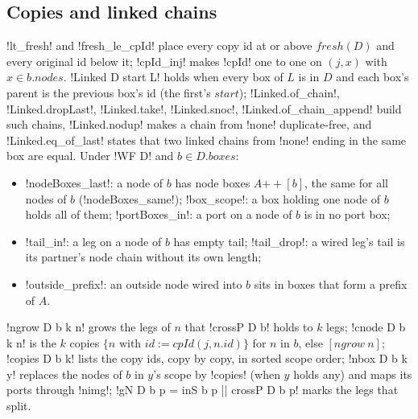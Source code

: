 {\subsection{Copies and linked chains}
\lbx!lt_fresh! and \lbx!fresh_le_cpId! place every copy id at or above $\mathit{fresh}(D)$ and every original id below it; \lbx!cpId_inj! makes \lbx!cpId! one to one on $(j,x)$ with $x\in b.\mathit{nodes}$. \lbx!Linked D start L! holds when every box of $L$ is in $D$ and each box's parent is the previous box's id (the first's $\mathit{start}$); \lbx!Linked.of_chain!, \lbx!Linked.dropLast!, \lbx!Linked.take!, \lbx!Linked.snoc!, \lbx!Linked.of_chain_append! build such chains, \lbx!Linked.nodup! makes a chain from \lbx!none! duplicate-free, and \lbx!Linked.eq_of_last! states that two linked chains from \lbx!none! ending in the same box are equal. Under \lbx!WF D! and $b\in D.\mathit{boxes}$:
\begin{itemize}
\item \lbx!nodeBoxes_last!: a node of $b$ has node boxes $A\mathbin{+\!\!+}[b]$, the same for all nodes of $b$ (\lbx!nodeBoxes_same!); \lbx!box_scope!: a box holding one node of $b$ holds all of them; \lbx!portBoxes_in!: a port on a node of $b$ is in no port box;
\item \lbx!tail_in!: a leg on a node of $b$ has empty tail; \lbx!tail_drop!: a wired leg's tail is its partner's node chain without its own length;
\item \lbx!outside_prefix!: an outside node wired into $b$ sits in boxes that form a prefix of $A$.
\end{itemize}

\begin{definition}\label{def:boxes-copy}
\lbx!ngrow D b k n! grows the legs of $n$ that \lbx!crossP D b! holds to $k$ legs; \lbx!cnode D b k n! is the $k$ copies $\{n\text{ with } \mathit{id}:=\mathit{cpId}(j,n.\mathit{id})\}$ for $n$ in $b$, else $[\mathit{ngrow}\ n]$; \lbx!copies D b k! lists the copy ids, copy by copy, in sorted scope order; \lbx!nbox D b k y! replaces the nodes of $b$ in $y$'s scope by \lbx!copies! (when $y$ holds any) and maps its ports through \lbx!nimg!; \lbx!gN D b p = inS b p || crossP D b p! marks the legs that split.
\end{definition}

}

